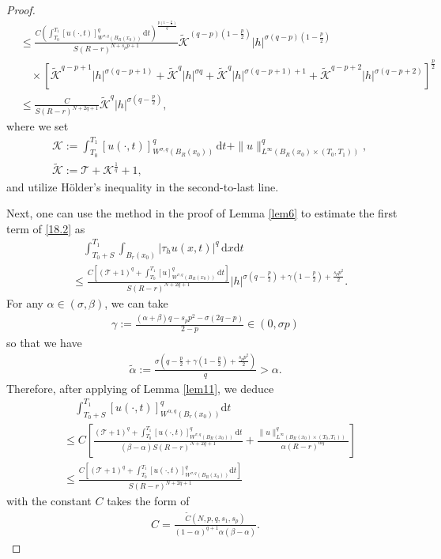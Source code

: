 \documentclass[reqno,10pt]{amsart}
\numberwithin{equation}{section}
\begin{document}
\begin{proof}
\begin{align}
		&\le \frac{C\left( \int_{T_0}^{T_1}[u(\cdot,t)]^q_{W^{\sigma,q}(B_R(x_0))}\,\mathrm{d}t\right)^{\frac{p\left(1-\frac{p}{2} \right) }{q}}}{S(R-r)^{N+s_pp+1}}\widetilde{\mathcal{K}}^{(q-p)\left(1-\frac{p}{2}\right)}|h|^{\sigma(q-p)\left(1-\frac{p}{2}\right)}\nonumber\\
		&\quad\times\left[\widetilde{\mathcal{K}}^{q-p+1}|h|^{\sigma(q-p+1)}+\widetilde{\mathcal{K}}^q|h|^{\sigma q}+\widetilde{\mathcal{K}}^q|h|^{\sigma(q-p+1)+1}+\widetilde{\mathcal{K}}^{q-p+2}|h|^{\sigma(q-p+2)}\right]^\frac{p}{2}\nonumber\\
		&\le\frac{C}{S(R-r)^{N+2q+1}}\widetilde{\mathcal{K}}^q|h|^{\sigma\left(q-\frac{p}{2}\right) },
	\end{align}
	where we set
	\begin{align*}
	&	\mathcal{K}:=\int_{T_0}^{T_1}[u(\cdot,t)]^q_{W^{\sigma,q}(B_R(x_0))}\,\mathrm{d}t+\|u\|^q_{L^\infty\left( B_{R}(x_0)\times(T_0,T_1)\right)},\\
	&	\widetilde{\mathcal{K}}:=\mathcal{T}+\mathcal{K}^\frac{1}{q}+1,
	\end{align*}
	and utilize H\"{o}lder's inequality in the second-to-last line.
	
	Next, one can use the method in the proof of Lemma \ref{lem6} to estimate the first term of \eqref{18.2} as 
	\begin{align}
		\label{18.3}
		&\quad\int_{T_0+S}^{T_1}\int_{B_r(x_0)}|\tau_hu(x,t)|^q\,\mathrm{d}x\mathrm{d}t\nonumber\\
		&\le\frac{C\left[ \left( \mathcal{T}+1\right)^q+\int_{T_0}^{T_1}[u]^q_{W^{\sigma,q}(B_R(x_0))} \,\mathrm{d}t\right] }{S(R-r)^{N+2q+1}}|h|^{\sigma\left( q-\frac{p}{2}\right)+\gamma\left(1-\frac{p}{2}\right)+\frac{s_pp^2}{2}}.
	\end{align}
	For any $\alpha\in (\sigma,\beta)$, we can take
	\begin{align*}
		\gamma:=\frac{(\alpha+\beta)q-s_pp^2-\sigma(2q-p)}{2-p}\in(0,\sigma p)
	\end{align*}
	so that we have
	\begin{align*}
		\tilde{\alpha}:=\frac{\sigma\left( q-\frac{p}{2}+\gamma\left( 1-\frac{p}{2}\right)+\frac{s_pp^2}{2}\right)}{q}>\alpha.
	\end{align*}
	Therefore, after applying of Lemma \ref{lem11}, we deduce
	\begin{align*}
		&\quad\int_{T_0+S}^{T_1}[u(\cdot,t)]^q_{W^{\alpha,q}\left( B_r(x_0)\right)}\mathrm{d}t\\
		&\le C\left[ \frac{(\mathcal{T}+1)^q+\int_{T_0}^{T_1}[u(\cdot,t)]^q_{W^{\sigma,q}(B_R(x_0))}\,\mathrm{d}t}{(\beta-\alpha)S(R-r)^{N+2q+1}}+\frac{\|u\|^q_{L^\infty\left(B_R(x_0)\times(T_0,T_1)\right)}}{\alpha(R-r)^{\alpha q}}\right]\\
		&\le\frac{C\left[\left(\mathcal{T}+1\right)^q+\int_{T_0}^{T_1}[u(\cdot,t)]^q_{W^{\sigma,q}\left( B_R(x_0)\right)}\mathrm{d}t\right]}{S(R-r)^{N+2q+1}}
	\end{align*}
	with the constant $C$ takes the form of
	\begin{align*}
		C=\frac{\widetilde{C}(N,p,q,s_1,s_p)}{(1-\alpha)^{q+1}\alpha(\beta-\alpha)}.
	\end{align*}
\end{proof}
\end{document}
